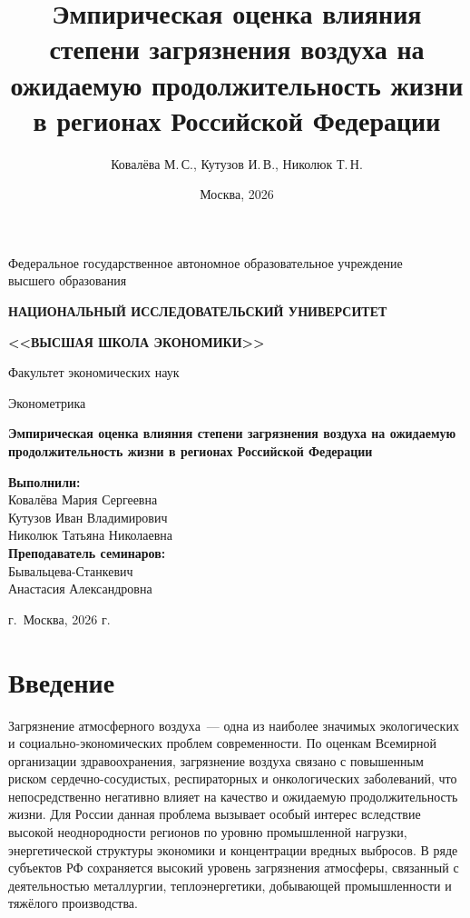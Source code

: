 \documentclass[10pt,a4paper]{article}
\title{Эмпирическая оценка влияния степени загрязнения воздуха на ожидаемую продолжительность жизни в регионах Российской Федерации}
\author{Ковалёва М.\,С., Кутузов И.\,В., Николюк Т.\,Н.}
\date{Москва, 2026}
\begin{document}
\begin{titlepage}
\centering
\vspace*{1cm}
{\large Федеральное государственное автономное образовательное учреждение\\
высшего образования\par}
\vspace{0.5cm}
{\Large \textbf{НАЦИОНАЛЬНЫЙ ИССЛЕДОВАТЕЛЬСКИЙ УНИВЕРСИТЕТ}\par}
\vspace{0.3cm}
{\Large \textbf{<<ВЫСШАЯ ШКОЛА ЭКОНОМИКИ>>}\par}
\vspace{0.5cm}
{\large Факультет экономических наук\par}
\vspace{0.3cm}
{\large Эконометрика\par}

\vfill

{\Large\bfseries Эмпирическая оценка влияния степени загрязнения воздуха на ожидаемую продолжительность жизни в регионах Российской Федерации\par}

\vfill

\begin{flushright}
\begin{minipage}{0.6\textwidth}
\raggedleft
\textbf{Выполнили:}\\[0.3em]
Ковалёва Мария Сергеевна\\
Кутузов Иван Владимирович\\
Николюк Татьяна Николаевна\\[1em]
\textbf{Преподаватель семинаров:}\\[0.3em]
Бывальцева-Станкевич\\
Анастасия Александровна
\end{minipage}
\end{flushright}

\vfill
{\large г.~Москва, 2026 г.\par}
\end{titlepage}

\section*{Введение}

Загрязнение атмосферного воздуха~--- одна из наиболее значимых экологических и социально-экономических проблем современности. По оценкам Всемирной организации здравоохранения, загрязнение воздуха связано с повышенным риском сердечно-сосудистых, респираторных и онкологических заболеваний, что непосредственно негативно влияет на качество и ожидаемую продолжительность жизни. Для России данная проблема вызывает особый интерес вследствие высокой неоднородности регионов по уровню промышленной нагрузки, энергетической структуры экономики и концентрации вредных выбросов. В ряде субъектов РФ сохраняется высокий уровень загрязнения атмосферы, связанный с деятельностью металлургии, теплоэнергетики, добывающей промышленности и тяжёлого производства.
\end{document}
